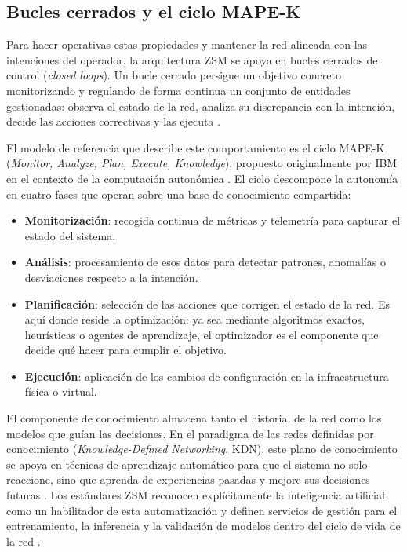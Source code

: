 \subsection{Bucles cerrados y el ciclo MAPE-K}\label{sec:mapek}

Para hacer operativas estas propiedades y mantener la red alineada con las intenciones del operador, la arquitectura ZSM se apoya en bucles cerrados de control (\textit{closed loops}). Un bucle cerrado persigue un objetivo concreto monitorizando y regulando de forma continua un conjunto de entidades gestionadas: observa el estado de la red, analiza su discrepancia con la intención, decide las acciones correctivas y las ejecuta \cite{etsi_zsm016}.

El modelo de referencia que describe este comportamiento es el ciclo MAPE-K (\textit{Monitor, Analyze, Plan, Execute, Knowledge}), propuesto originalmente por IBM en el contexto de la computación autonómica \cite{kephart2003vision}. El ciclo descompone la autonomía en cuatro fases que operan sobre una base de conocimiento compartida:

\begin{itemize}
	\item \textbf{Monitorización}: recogida continua de métricas y telemetría para capturar el estado del sistema.
	\item \textbf{Análisis}: procesamiento de esos datos para detectar patrones, anomalías o desviaciones respecto a la intención.
	\item \textbf{Planificación}: selección de las acciones que corrigen el estado de la red. Es aquí donde reside la optimización: ya sea mediante algoritmos exactos, heurísticas o agentes de aprendizaje, el optimizador es el componente que decide qué hacer para cumplir el objetivo.
	\item \textbf{Ejecución}: aplicación de los cambios de configuración en la infraestructura física o virtual.
\end{itemize}

El componente de conocimiento almacena tanto el historial de la red como los modelos que guían las decisiones. En el paradigma de las redes definidas por conocimiento (\textit{Knowledge-Defined Networking}, KDN), este plano de conocimiento se apoya en técnicas de aprendizaje automático para que el sistema no solo reaccione, sino que aprenda de experiencias pasadas y mejore sus decisiones futuras \cite{mestres2017knowledge,he2023routing}. Los estándares ZSM reconocen explícitamente la inteligencia artificial como un habilitador de esta automatización y definen servicios de gestión para el entrenamiento, la inferencia y la validación de modelos dentro del ciclo de vida de la red \cite{etsi_zsm012}.

